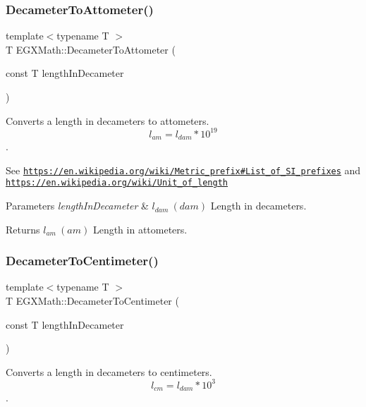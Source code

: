 \subsubsection{\texorpdfstring{Decameter\+To\+Attometer()}{DecameterToAttometer()}}
{\footnotesize\ttfamily template$<$typename T $>$ \\
T E\+G\+X\+Math\+::\+Decameter\+To\+Attometer (\begin{DoxyParamCaption}\item[{const T}]{length\+In\+Decameter }\end{DoxyParamCaption})}



Converts a length in decameters to attometers. \[ l_{am}=l_{dam} * 10^{19} \]. 

See \href{https://en.wikipedia.org/wiki/Metric_prefix#List_of_SI_prefixes}{\tt https\+://en.\+wikipedia.\+org/wiki/\+Metric\+\_\+prefix\#\+List\+\_\+of\+\_\+\+S\+I\+\_\+prefixes} and \href{https://en.wikipedia.org/wiki/Unit_of_length}{\tt https\+://en.\+wikipedia.\+org/wiki/\+Unit\+\_\+of\+\_\+length} 
\begin{DoxyParams}{Parameters}
{\em length\+In\+Decameter} & $ l_{dam}\ (dam)$ Length in decameters. \\
\hline
\end{DoxyParams}
\begin{DoxyReturn}{Returns}
$ l_{am}\ (am)$ Length in attometers. 
\end{DoxyReturn}
\mbox{\label{group___e_g_x_math-_conversions-_length_conversions-_s_i-_decameter-_s_i_gab715f0e130e7886966146153786abc5d}} 
\subsubsection{\texorpdfstring{Decameter\+To\+Centimeter()}{DecameterToCentimeter()}}
{\footnotesize\ttfamily template$<$typename T $>$ \\
T E\+G\+X\+Math\+::\+Decameter\+To\+Centimeter (\begin{DoxyParamCaption}\item[{const T}]{length\+In\+Decameter }\end{DoxyParamCaption})}



Converts a length in decameters to centimeters. \[ l_{cm}=l_{dam} * 10^{3} \]. 

